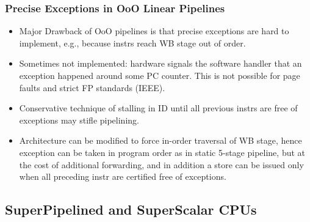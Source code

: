\documentclass{beamer}
\newcommand{\emp}[1]{\textcolor{DikuRed}{ #1}}
\begin{document}
\begin{frame}[fragile,t]
\frametitle{Precise Exceptions in OoO Linear Pipelines}

\begin{scriptsize}
\begin{itemize}
\item \emp{Major Drawback} of OoO pipelines is that precise exceptions are hard
            to implement, e.g., because instrs reach WB stage out of order.
            
\item \emp{Sometimes not implemented}: hardware signals the software handler that
            an exception happened around some PC counter. This is not possible
            for page faults and strict FP standards (IEEE).\smallskip
\item Conservative technique of stalling in ID until all previous instrs
        are free of exceptions may stifle pipelining.\smallskip

\item Architecture can be modified to force in-order traversal of WB stage,
        hence exception can be taken in program order as in static 5-stage 
        pipeline, but at the cost of additional forwarding, and in addition
        a store can be issued only when all preceding instr are certified 
        free of exceptions. 
\end{itemize}
\end{scriptsize}
\end{frame}

\subsection{SuperPipelined and SuperScalar CPUs}
\end{document}
